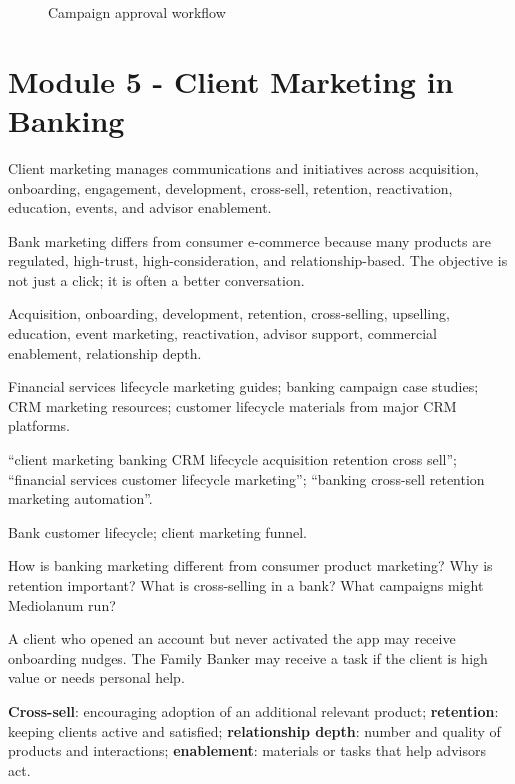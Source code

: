 \documentclass[
	11pt,
	fleqn,
	a4paper,
	oneside,
]{LegrandOrangeBook}
\newcommand{\moduleblock}[9]{%
	\begin{description}[leftmargin=3.4cm, style=nextline, font=\sffamily\bfseries]
		\item[What it is] #1
		\item[Why it matters] #2
		\item[Key concepts] #3
		\item[Resources to find] #4
		\item[Search queries] #5
		\item[Diagrams] #6
		\item[Practical questions] #7
		\item[Mini case] #8
		\item[Key terms] #9
	\end{description}
}
\newcommand{\term}[2]{\textbf{#1}: #2}
\begin{document}
\begin{figure}[H]
	\centering
	\caption{Campaign approval workflow}
\end{figure}

\section{Module 5 - Client Marketing in Banking}

\moduleblock
{Client marketing manages communications and initiatives across acquisition, onboarding, engagement, development, cross-sell, retention, reactivation, education, events, and advisor enablement.}
{Bank marketing differs from consumer e-commerce because many products are regulated, high-trust, high-consideration, and relationship-based. The objective is not just a click; it is often a better conversation.}
{Acquisition, onboarding, development, retention, cross-selling, upselling, education, event marketing, reactivation, advisor support, commercial enablement, relationship depth.}
{Financial services lifecycle marketing guides; banking campaign case studies; CRM marketing resources; customer lifecycle materials from major CRM platforms.}
{``client marketing banking CRM lifecycle acquisition retention cross sell''; ``financial services customer lifecycle marketing''; ``banking cross-sell retention marketing automation''.}
{Bank customer lifecycle; client marketing funnel.}
{How is banking marketing different from consumer product marketing? Why is retention important? What is cross-selling in a bank? What campaigns might Mediolanum run?}
{A client who opened an account but never activated the app may receive onboarding nudges. The Family Banker may receive a task if the client is high value or needs personal help.}
{\term{Cross-sell}{encouraging adoption of an additional relevant product}; \term{retention}{keeping clients active and satisfied}; \term{relationship depth}{number and quality of products and interactions}; \term{enablement}{materials or tasks that help advisors act}.}
\end{document}
